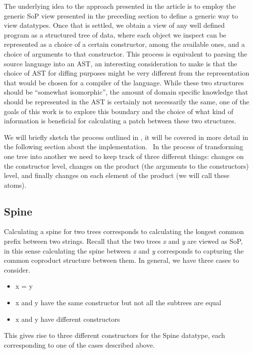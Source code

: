 \documentclass[11pt]{article}
\begin{document}
The underlying idea to the approach presented in the article is to employ
the generic SoP view presented in the preceding section to define a
generic way to view datatypes. Once that is settled, we obtain a view of
any well defined program as a structured tree of data, where each object
we inspect can be represented as a choice of a certain constructor,
among the available ones, and a choice of arguments to that constructor.
This process is equivalent to parsing the source language into an AST,
an interesting consideration to make is that the choice of AST for
diffing purposes might be very different from the representation that
would be chosen for a compiler of the language. While these two
structures should be ``somewhat isomorphic'', the amount of domain
specific knowledge that should be represented in the AST is certainly
not necessarily the same, one of the goals of this work is to explore
this boundary and the choice of what kind of information is beneficial
for calculating a patch between these two structures.

We will briefly sketch the process outlined in \cite{type-directed diff}, it 
will be covered in more detail in the following section about the 
implementation.
\ 
In the process of transforming one tree into another we need to keep track of three different things: 
changes on the constructor level, changes on the product (the arguments to the constructors) 
level, and finally changes on each element of the product (we will call these 
atoms).
\subsection{Spine}\label{spine}

Calculating a spine for two trees corresponds to calculating the
longest common prefix between two strings. Recall that the two trees
\emph{x} and \emph{y} are viewed as SoP, in this sense calculating the
spine between \emph{x} and \emph{y} corresponds to capturing the common
coproduct structure between them. In general, we have three cases to
consider. 
\begin{itemize}
  \item x = y 
  \item x and y have the same constructor but not all the
subtrees are equal  
  \item x and y have different constructors
\end{itemize}
 This gives rise
to three different constructors for the Spine datatype, each
corresponding to one of the cases described above.
\end{document}
